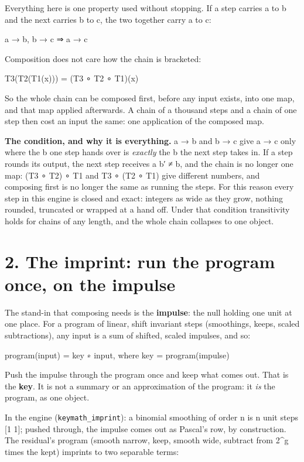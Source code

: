 Everything here is one property used without stopping. If a step carries a to b and the next carries b to c, the two together carry a to c:

a → b,  b → c   ⇒   a → c

Composition does not care how the chain is bracketed:

T3(T2(T1(x))) = (T3 ∘ T2 ∘ T1)(x)

So the whole chain can be composed first, before any input exists, into one map, and that map applied afterwards. A chain of a thousand steps and a chain of one step then cost an input the same: one application of the composed map.

\textbf{The condition, and why it is everything.} a → b and b → c give a → c only where the b one step hands over is \emph{exactly} the b the next step takes in. If a step rounds its output, the next step receives a b′ ≠ b, and the chain is no longer one map: (T3 ∘ T2) ∘ T1 and T3 ∘ (T2 ∘ T1) give different numbers, and composing first is no longer the same as running the steps. For this reason every step in this engine is closed and exact: integers as wide as they grow, nothing rounded, truncated or wrapped at a hand off. Under that condition transitivity holds for chains of any length, and the whole chain collapses to one object.

\section{\texorpdfstring{2. The imprint: run the program once, on the impulse}{2. The imprint: run the program once, on the impulse}}

The stand-in that composing needs is the \textbf{impulse}: the null holding one unit at one place. For a program of linear, shift invariant steps (smoothings, keeps, scaled subtractions), any input is a sum of shifted, scaled impulses, and so:

program(input) = key ∗ input,    where  key = program(impulse)

Push the impulse through the program once and keep what comes out. That is the \textbf{key}. It is not a summary or an approximation of the program: it \emph{is} the program, as one object.

In the engine (\texttt{keymath\_\allowbreak{}imprint}): a binomial smoothing of order n is n unit steps [1 1]; pushed through, the impulse comes out as Pascal's row, by construction. The residual's program (smooth narrow, keep, smooth wide, subtract from 2\textasciicircum{}g times the kept) imprints to two separable terms:

